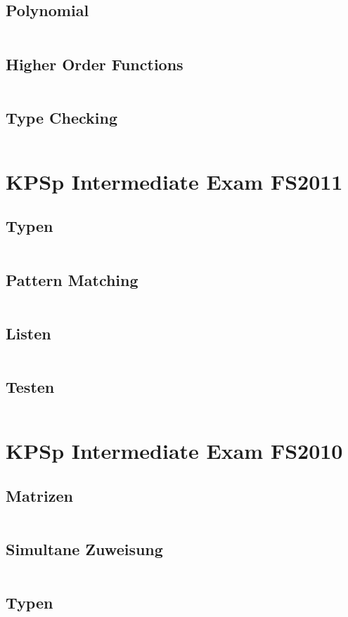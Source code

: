 \documentclass[a4paper,9pt,twoside]{book}
\newcommand{\hsfile}[1]{\inputminted[breaklines]{haskell}{../haskell/#1.hs}}
\begin{document}
\section{Polynomial}
\hsfile{exam2010/problem_2}
\section{Higher Order Functions}
\hsfile{exam2010/problem_3}
\section{Type Checking}
\hsfile{exam2010/problem_4}

\chapter{KPSp Intermediate Exam FS2011}
\section{Typen}
\hsfile{exam2011/problem_1}
\section{Pattern Matching}
\hsfile{exam2011/problem_2}
\section{Listen}
\hsfile{exam2011/problem_3}
\section{Testen}
\hsfile{exam2011/problem_4}

\chapter{KPSp Intermediate Exam FS2010}
\section{Matrizen}
\hsfile{exam2009/problem_1}
\section{Simultane Zuweisung}
\hsfile{exam2009/problem_2}
\section{Typen}
\hsfile{exam2009/problem_3}
\end{document}
